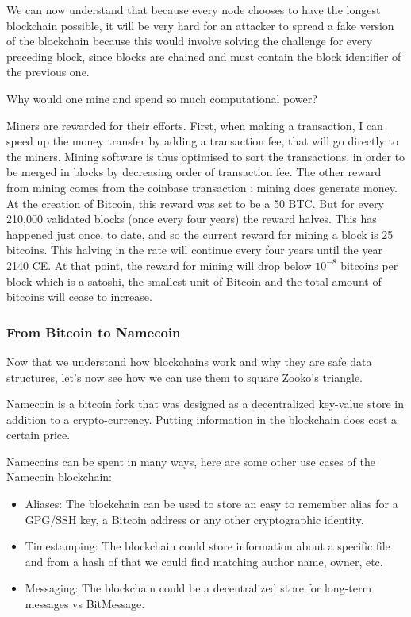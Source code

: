 \documentclass{vldb}
\begin{document}
We can now understand that because every node chooses to have the longest blockchain possible, it will be very hard for an attacker to spread a fake version of the blockchain because this would involve solving the challenge for every preceding block, since blocks are chained and must contain the block identifier of the previous one. 


Why would one mine and spend so much computational power?


Miners are rewarded for their efforts. First, when making a transaction, I can speed up the money transfer by adding a transaction fee, that will go directly to the miners. Mining software is thus optimised to sort the transactions, in order to be merged in blocks by decreasing order of transaction fee. 
The other reward from mining comes from the coinbase transaction : mining does generate money.  At the creation of Bitcoin, this reward was set to be a 50 BTC. But for every 210,000 validated blocks (once every four years) the reward halves. This has happened just once, to date, and so the current reward for mining a block is 25 bitcoins. This halving in the rate will continue every four years until the year 2140 CE. At that point, the reward for mining will drop below $10^{-8}$ bitcoins per block which is a satoshi, the smallest unit of Bitcoin and the total amount of bitcoins will cease to increase.

\subsubsection{From Bitcoin to Namecoin}

Now that we understand how blockchains work and why they are safe data structures, let's now see how we can use them to square Zooko's triangle. 

Namecoin is a bitcoin fork that was designed as a decentralized key-value store in addition to a crypto-currency. Putting information in the blockchain does cost a certain price.

Namecoins can be spent in many ways, here are some other use cases of the Namecoin blockchain:
\begin{itemize}
\item Aliases: The blockchain can be used to store an easy to remember alias for a GPG/SSH key, a Bitcoin address or any other cryptographic identity.
\item Timestamping: The blockchain could store information about a specific file and from a hash of that we could find matching author name, owner, etc.
\item Messaging: The blockchain could be a decentralized store for  long-term messages vs BitMessage.
\end{itemize}
\end{document}
